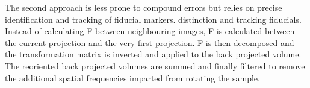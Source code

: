 %

The second approach is less prone to compound errors but relies on precise identification and tracking of fiducial markers.
distinction and tracking fiducials.
Instead of calculating \gls{F} between neighbouring images, \gls{F} is calculated between the current projection and the very first projection.
\gls{F} is then decomposed and the transformation matrix is inverted and applied to the back projected volume.
The reoriented back projected volumes are summed and finally filtered to remove the additional spatial frequencies imparted from rotating the sample.


